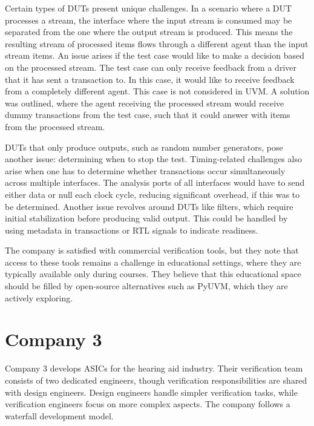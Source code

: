 Certain types of DUTs present unique challenges. In a scenario where a DUT processes a stream, the interface where
the input stream is consumed may be separated from the one where the output stream is produced. This means the
resulting stream of processed items flows through a different agent than the input stream items. An issue arises if the
test case would like to make a decision based on the processed stream. The test case can only receive feedback from a
driver that it has sent a transaction to. In this case, it would like to receive feedback from a completely different
agent. This case is not considered in UVM. A solution was outlined, where the agent receiving the processed stream
would receive dummy transactions from the test case, such that it could answer with items from the processed stream.

DUTs that only produce outputs, such as random number generators, pose another issue: determining when to stop the
test. Timing-related challenges also arise when one has to determine whether transactions occur simultaneously
across multiple interfaces. The analysis ports of all interfaces would have to send either data or null each clock
cycle, reducing significant overhead, if this was to be determined. Another issue revolves around DUTs like filters,
which require initial stabilization before producing valid output. This could be handled by using metadata in
transactions or RTL signals to indicate readiness.

The company is satisfied with commercial verification tools, but they note that access to these tools remains a
challenge in educational settings, where they are typically available only during courses. They believe that this
educational space should be filled by open-source alternatives such as PyUVM, which they are actively exploring.

\section{Company 3} %

Company 3 develops ASICs for the hearing aid industry. Their verification team consists of two dedicated engineers,
though verification responsibilities are shared with design engineers. Design engineers handle simpler verification
tasks, while verification engineers focus on more complex aspects. The company follows a waterfall development model.


